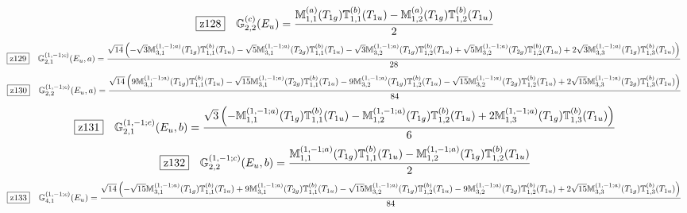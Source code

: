 \documentclass[fleqn,10pt,landscape]{jsarticle}
\begin{document}
\begin{dmath*}
\hspace*{3mm}\fbox{z128}\quad \mathbb{G}_{2,2}^{(c)}(E_{u})=\frac{\mathbb{M}_{1,1}^{(a)}(T_{1g}) \mathbb{T}_{1,1}^{(b)}(T_{1u}) - \mathbb{M}_{1,2}^{(a)}(T_{1g}) \mathbb{T}_{1,2}^{(b)}(T_{1u})}{2}
\end{dmath*}
\begin{dmath*}
\hspace*{3mm}\fbox{z129}\quad \mathbb{G}_{2,1}^{(1,-1;c)}(E_{u},a)=\frac{\sqrt{14} \left(- \sqrt{3} \mathbb{M}_{3,1}^{(1,-1;a)}(T_{1g}) \mathbb{T}_{1,1}^{(b)}(T_{1u}) - \sqrt{5} \mathbb{M}_{3,1}^{(1,-1;a)}(T_{2g}) \mathbb{T}_{1,1}^{(b)}(T_{1u}) - \sqrt{3} \mathbb{M}_{3,2}^{(1,-1;a)}(T_{1g}) \mathbb{T}_{1,2}^{(b)}(T_{1u}) + \sqrt{5} \mathbb{M}_{3,2}^{(1,-1;a)}(T_{2g}) \mathbb{T}_{1,2}^{(b)}(T_{1u}) + 2 \sqrt{3} \mathbb{M}_{3,3}^{(1,-1;a)}(T_{1g}) \mathbb{T}_{1,3}^{(b)}(T_{1u})\right)}{28}
\end{dmath*}
\begin{dmath*}
\hspace*{3mm}\fbox{z130}\quad \mathbb{G}_{2,2}^{(1,-1;c)}(E_{u},a)=\frac{\sqrt{14} \left(9 \mathbb{M}_{3,1}^{(1,-1;a)}(T_{1g}) \mathbb{T}_{1,1}^{(b)}(T_{1u}) - \sqrt{15} \mathbb{M}_{3,1}^{(1,-1;a)}(T_{2g}) \mathbb{T}_{1,1}^{(b)}(T_{1u}) - 9 \mathbb{M}_{3,2}^{(1,-1;a)}(T_{1g}) \mathbb{T}_{1,2}^{(b)}(T_{1u}) - \sqrt{15} \mathbb{M}_{3,2}^{(1,-1;a)}(T_{2g}) \mathbb{T}_{1,2}^{(b)}(T_{1u}) + 2 \sqrt{15} \mathbb{M}_{3,3}^{(1,-1;a)}(T_{2g}) \mathbb{T}_{1,3}^{(b)}(T_{1u})\right)}{84}
\end{dmath*}
\begin{dmath*}
\hspace*{3mm}\fbox{z131}\quad \mathbb{G}_{2,1}^{(1,-1;c)}(E_{u},b)=\frac{\sqrt{3} \left(- \mathbb{M}_{1,1}^{(1,-1;a)}(T_{1g}) \mathbb{T}_{1,1}^{(b)}(T_{1u}) - \mathbb{M}_{1,2}^{(1,-1;a)}(T_{1g}) \mathbb{T}_{1,2}^{(b)}(T_{1u}) + 2 \mathbb{M}_{1,3}^{(1,-1;a)}(T_{1g}) \mathbb{T}_{1,3}^{(b)}(T_{1u})\right)}{6}
\end{dmath*}
\begin{dmath*}
\hspace*{3mm}\fbox{z132}\quad \mathbb{G}_{2,2}^{(1,-1;c)}(E_{u},b)=\frac{\mathbb{M}_{1,1}^{(1,-1;a)}(T_{1g}) \mathbb{T}_{1,1}^{(b)}(T_{1u}) - \mathbb{M}_{1,2}^{(1,-1;a)}(T_{1g}) \mathbb{T}_{1,2}^{(b)}(T_{1u})}{2}
\end{dmath*}
\begin{dmath*}
\hspace*{3mm}\fbox{z133}\quad \mathbb{G}_{4,1}^{(1,-1;c)}(E_{u})=\frac{\sqrt{14} \left(- \sqrt{15} \mathbb{M}_{3,1}^{(1,-1;a)}(T_{1g}) \mathbb{T}_{1,1}^{(b)}(T_{1u}) + 9 \mathbb{M}_{3,1}^{(1,-1;a)}(T_{2g}) \mathbb{T}_{1,1}^{(b)}(T_{1u}) - \sqrt{15} \mathbb{M}_{3,2}^{(1,-1;a)}(T_{1g}) \mathbb{T}_{1,2}^{(b)}(T_{1u}) - 9 \mathbb{M}_{3,2}^{(1,-1;a)}(T_{2g}) \mathbb{T}_{1,2}^{(b)}(T_{1u}) + 2 \sqrt{15} \mathbb{M}_{3,3}^{(1,-1;a)}(T_{1g}) \mathbb{T}_{1,3}^{(b)}(T_{1u})\right)}{84}
\end{dmath*}
\end{document}
